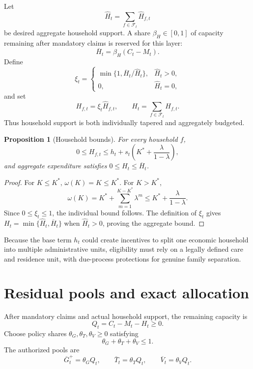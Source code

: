 \documentclass[11pt]{article}
\newtheorem{proposition}[definition]{Proposition}
\begin{document}
Let
\begin{equation}
  \widehat H_t=\sum_{f\in\mathcal F_t}\widehat H_{f,t}
\end{equation}
be desired aggregate household support. A share $\beta_H\in[0,1]$ of capacity remaining
after mandatory claims is reserved for this layer:
\begin{equation}
  \overline H_t=\beta_H(C_t-M_t).
\end{equation}
Define
\begin{equation}
  \xi_t=
  \begin{cases}
    \min\{1,\overline H_t/\widehat H_t\}, & \widehat H_t>0,\\
    0, & \widehat H_t=0,
  \end{cases}
\end{equation}
and set
\begin{equation}
  H_{f,t}=\xi_t\widehat H_{f,t},
  \qquad H_t=\sum_{f\in\mathcal F_t}H_{f,t}.
\end{equation}
Thus household support is both individually tapered and aggregately budgeted.

\begin{proposition}[Household bounds]
For every household $f$,
\begin{equation}
  0\le H_{f,t}\le h_t+s_t\left(K^*+\frac{\lambda}{1-\lambda}\right),
\end{equation}
and aggregate expenditure satisfies $0\le H_t\le\overline H_t$.
\end{proposition}

\begin{proof}
For $K\le K^*$, $\omega(K)=K\le K^*$. For $K>K^*$,
\[
\omega(K)=K^*+\sum_{m=1}^{K-K^*}\lambda^m
\le K^*+\frac{\lambda}{1-\lambda}.
\]
Since $0\le\xi_t\le1$, the individual bound follows. The definition of $\xi_t$ gives
$H_t=\min\{\widehat H_t,\overline H_t\}$ when $\widehat H_t>0$, proving the aggregate
bound.
\end{proof}

Because the base term $h_t$ could create incentives to split one economic household
into multiple administrative units, eligibility must rely on a legally defined care and
residence unit, with due-process protections for genuine family separation.

\section{Residual pools and exact allocation}

After mandatory claims and actual household support, the remaining capacity is
\begin{equation}
  Q_t=C_t-M_t-H_t\ge0.
\end{equation}
Choose policy shares $\theta_G,\theta_T,\theta_V\ge0$ satisfying
\begin{equation}
  \theta_G+\theta_T+\theta_V\le1.
\end{equation}
The authorized pools are
\begin{equation}
  \overline G_t^{+}=\theta_GQ_t,
  \qquad
  \overline T_t=\theta_TQ_t,
  \qquad
  \overline V_t=\theta_VQ_t.
\end{equation}
\end{document}
